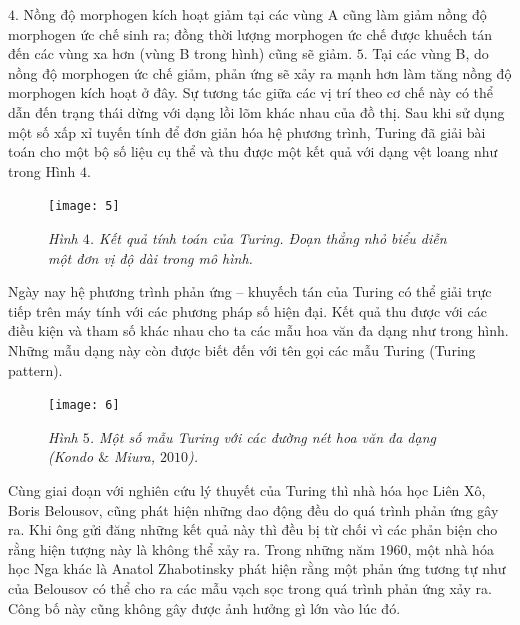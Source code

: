\begin{multicols}{2}
	\vskip 0.05cm
	$4.$ Nồng độ morphogen kích hoạt giảm tại các vùng A cũng làm giảm nồng độ morphogen ức chế sinh ra; đồng thời lượng morphogen ức chế được khuếch tán đến các vùng xa hơn (vùng B trong hình) cũng sẽ giảm.
	\vskip 0.05cm
	$5.$ Tại các vùng B, do nồng độ morphogen ức chế giảm, phản ứng sẽ xảy ra mạnh hơn làm tăng nồng độ morphogen kích hoạt ở đây. Sự tương tác giữa các vị trí theo cơ chế này có thể dẫn đến trạng thái dừng với dạng lồi lõm khác nhau của đồ thị.
	\vskip 0.05cm
	Sau khi sử dụng một số xấp xỉ tuyến tính để đơn giản hóa hệ phương trình, Turing đã giải bài toán cho một bộ số liệu cụ thể và thu được một kết quả với dạng vệt loang như trong Hình $4$. 
	\begin{figure}[H]
		\vspace*{-5pt}
		\centering
		\captionsetup{labelformat= empty, justification=centering}
		\texttt{[image: 5]}
		\caption{\small\textit{\color{timhieukhoahoc}Hình $4$. Kết quả tính toán của Turing. Đoạn thẳng nhỏ biểu diễn một đơn vị độ dài trong mô hình.}}
		\vspace*{-10pt}
	\end{figure}
	Ngày nay hệ phương trình phản ứng -- khuyếch tán của Turing có thể giải trực tiếp trên máy tính với các phương pháp số hiện đại. Kết quả thu được với các điều kiện và tham số khác nhau cho ta các mẫu hoa văn đa dạng như trong hình. Những mẫu dạng này còn được biết đến với tên gọi các mẫu Turing (Turing pattern). 
	\begin{figure}[H]
		\vspace*{-5pt}
		\centering
		\captionsetup{labelformat= empty, justification=centering}
		\texttt{[image: 6]}
		\caption{\small\textit{\color{timhieukhoahoc}Hình $5$. Một số mẫu Turing với các đường nét hoa văn đa dạng (Kondo $\&$ Miura, $2010$).}}
		\vspace*{-10pt}
	\end{figure}
	Cùng giai đoạn với nghiên cứu lý thuyết của Turing thì nhà hóa học Liên Xô, Boris Belousov, cũng phát hiện những dao động đều do quá trình phản ứng gây ra. Khi ông gửi đăng những kết quả này thì đều bị từ chối vì các phản biện cho rằng hiện tượng này là không thể xảy ra. Trong những năm $1960$, một nhà hóa học Nga khác là Anatol Zhabotinsky phát hiện rằng một phản ứng tương tự như của Belousov có thể cho ra các mẫu vạch sọc trong quá trình phản ứng xảy ra. Công bố này cũng không gây được ảnh hưởng gì lớn vào lúc đó.
	\vskip 0.05cm

\end{multicols}
